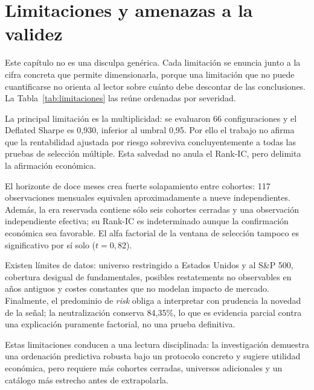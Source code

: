 \chapter{Limitaciones y amenazas a la validez}
\label{chap:limitaciones}

Este capítulo no es una disculpa genérica. Cada limitación se enuncia junto a la cifra concreta que
permite dimensionarla, porque una limitación que no puede cuantificarse no orienta al lector sobre
cuánto debe descontar de las conclusiones. La Tabla~\ref{tab:limitaciones} las reúne ordenadas por
severidad.

\begin{table}[H]
  \centering
  \footnotesize
  \caption{Limitaciones, evidencia que las cuantifica y severidad asignada.}
  \label{tab:limitaciones}
  
  \caption*{La severidad es un juicio del autor sobre cuánto condiciona cada limitación las
  conclusiones, no una medida estadística.}
\end{table}

La principal limitación es la multiplicidad: se evaluaron 66 configuraciones y el Deflated Sharpe
es 0,930, inferior al umbral 0,95. Por ello el trabajo no afirma que la rentabilidad ajustada por
riesgo sobreviva concluyentemente a todas las pruebas de selección múltiple. Esta salvedad no anula
el Rank-IC, pero delimita la afirmación económica.

El horizonte de doce meses crea fuerte solapamiento entre cohortes: 117 observaciones mensuales
equivalen aproximadamente a nueve independientes. Además, la era reservada contiene sólo seis
cohortes cerradas y una observación independiente efectiva; su Rank-IC es indeterminado aunque la
confirmación económica sea favorable. El alfa factorial de la ventana de selección tampoco es
significativo por sí solo ($t=0,82$).

Existen límites de datos: universo restringido a Estados Unidos y al S\&P 500, cobertura desigual
de fundamentales, posibles restatements no observables en años antiguos y costes constantes que no
modelan impacto de mercado. Finalmente, el predominio de \textit{risk} obliga a interpretar con
prudencia la novedad de la señal; la neutralización conserva 84,35\%, lo que es evidencia parcial
contra una explicación puramente factorial, no una prueba definitiva.

Estas limitaciones conducen a una lectura disciplinada: la investigación demuestra una ordenación
predictiva robusta bajo un protocolo concreto y sugiere utilidad económica, pero requiere más
cohortes cerradas, universos adicionales y un catálogo más estrecho antes de extrapolarla.

